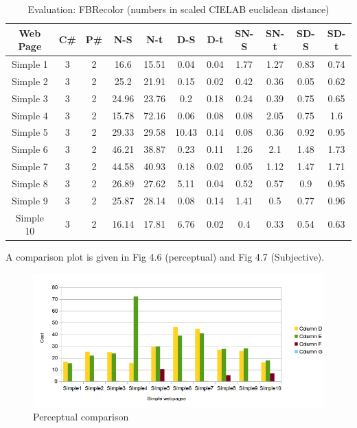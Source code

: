 \begin{table}[!htb]
\caption{Evaluation: FBRecolor (numbers in scaled CIELAB euclidean distance)}
\centering
\begin{tabular}{c c c c c c c c c c c}
\hline\hline
Web Page & C\# & P\# & N-S & N-t & D-S & D-t & SN-S & SN-t & SD-S & SD-t\\ [0.5ex]
\hline
Simple 1&3&2&16.6&15.51&0.04&0.04&1.77&1.27&0.83&0.74\\
Simple 2&3&2&25.2&21.91&0.15&0.02&0.42&0.36&0.05&0.62\\
Simple 3&3&2&24.96&23.76&0.2&0.18&0.24&0.39&0.75&0.65\\
Simple 4&3&2&15.78&72.16&0.06&0.08&0.08&2.05&0.75&1.6\\
Simple 5&3&2&29.33&29.58&10.43&0.14&0.08&0.36&0.92&0.95\\
Simple 6&3&2&46.21&38.87&0.23&0.11&1.26&2.1&1.48&1.73\\
Simple 7&3&2&44.58&40.93&0.18&0.02&0.05&1.12&1.47&1.71\\
Simple 8&3&2&26.89&27.62&5.11&0.04&0.52&0.57&0.9&0.95\\
Simple 9&3&2&25.87&28.14&0.08&0.14&1.41&0.5&0.77&0.96\\
Simple 10&3&2&16.14&17.81&6.76&0.02&0.4&0.33&0.54&0.63\\[1ex]
\hline
\end{tabular}
\label{table:nonlin}
\end{table}

A comparison plot is given in Fig 4.6 (perceptual) and Fig 4.7 (Subjective). 


\begin{figure}[!htb]
\centering
  \includegraphics[width=\linewidth]{simpleRP.png}
  \caption{Perceptual comparison}
  \label{fig:sub1}
\end{figure}

